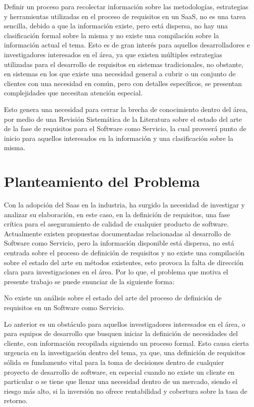 \documentclass{article}
\begin{document}
Definir un proceso para recolectar información sobre las metodologías, estrategias y herramientas utilizadas en el proceso de requisitos en un SaaS, no es una tarea sencilla, debido a que la información existe, 
pero está dispersa, no hay una clasificación formal sobre la misma y no existe una compilación sobre la información actual el tema. Esto es de gran interés para aquellos desarrolladores e investigadores interesados 
en el área, ya que existen múltiples estrategias utilizadas para el desarrollo de requisitos en sistemas tradicionales, no obstante, en sistemas en los que existe una necesidad general a cubrir o un conjunto de 
clientes con una necesidad en común, pero con detalles específicos, se presentan complejidades que necesitan atención especial. 
 
Esto genera una necesidad para cerrar la brecha de conocimiento dentro del área, por medio de una Revisión Sistemática de la Literatura sobre el estado del arte de la fase de requisitos para el Software como Servicio, la 
cual proveerá punto de inicio para aquellos interesados en la información y una clasificación sobre la misma.
\newpage

\section{Planteamiento del Problema}
Con la adopción del Saas en la industria, ha surgido la necesidad de investigar y analizar su elaboración, en este caso, en la definición de requisitos, una fase crítica para el aseguramiento de calidad de cualquier 
producto de software. Actualmente existen propuestas documentadas relacionadas al desarrollo de Software como Servicio, pero la información disponible está dispersa, no está centrada sobre el proceso de 
definición de requisitos y no existe una compilación sobre el estado del arte en métodos existentes, esto provoca la falta de dirección clara para investigaciones en el área. Por lo que, el problema que 
motiva el presente trabajo se puede enunciar de la siguiente forma:

No existe un análisis sobre el estado del arte del proceso de definición de requisitos en un Software como Servicio.

Lo anterior es un obstáculo para aquellos investigadores interesados en el área, o para equipos de desarrollo que busquen iniciar la definición de necesidades del cliente, con información recopilada siguiendo un proceso formal. 
Esto causa cierta urgencia en la investigación dentro del tema, ya que, una definición de requisitos sólida es fundamento vital para la toma de decisiones dentro de cualquier proyecto de desarrollo de software, 
en especial cuando no existe un cliente en particular o se tiene que llenar una necesidad dentro de un mercado, siendo el riesgo más alto, si la inversión no ofrece rentabilidad y cobertura sobre la tasa de retorno. 
\end{document}
